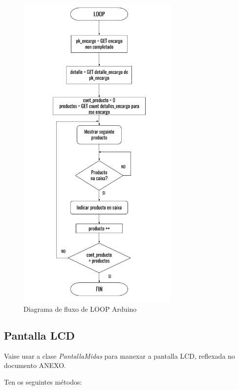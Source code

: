 \documentclass[11pt,twoside]{book}
\begin{document}
\begin{figure}[H]
	\begin{center}
		\includegraphics[width=8cm]{images/diagrama_flujo_loop.png}
	\end{center}
	\caption{Diagrama de fluxo de LOOP Arduino}
	\label{fig:FluxoLOOP}
\end{figure}
 
\subsection{Pantalla LCD}

Vaise usar a clase \textit{PantallaMidas} para manexar a pantalla LCD, reflexada no documento ANEXO. 

Ten os seguintes métodos:
\end{document}
